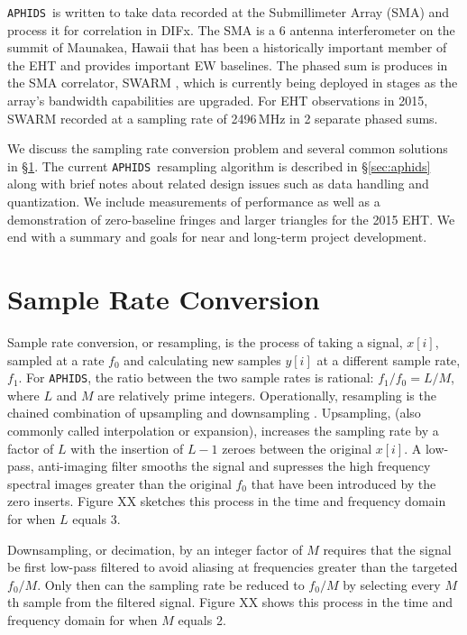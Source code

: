 \documentclass[11pt,preprint]{aastex}
\newcommand{\APHIDS}{\texttt{APHIDS}}
\begin{document}
\APHIDS\, is written to take data recorded at the Submillimeter Array (SMA) and process it for correlation in 
DIFx.  The SMA is a 6 antenna interferometer on the summit of Maunakea, Hawaii that has been a historically 
important member of the EHT and provides important EW baselines.  The phased sum is produces in the SMA 
correlator, SWARM \citep[\textbf{S}MA \textbf{W}ideband \textbf{A}stronomical \textbf{R}OACH2 \textbf{M}achine][]{weintroub14}, which is currently being deployed in stages as the array's bandwidth capabilities are 
upgraded.  For EHT observations in 2015, SWARM recorded at a sampling rate of 2496\,MHz in 2 separate phased
sums.

We discuss the sampling rate conversion problem and several common solutions in \S\ref{sec:src_basics}.
The current \APHIDS\, resampling algorithm is described in \S\ref{sec:aphids} along with brief notes about related 
design issues such as data handling and quantization.  We include measurements of performance as well as a 
demonstration of zero-baseline fringes and larger triangles for the 2015 EHT.  We end with a summary and 
goals for near and long-term project development.

\section{Sample Rate Conversion} \label{sec:src_basics}

Sample rate conversion, or resampling, is the process of taking a signal, $x[i]$, sampled at a rate $f_0$ and 
calculating new samples $y[i]$ at a different sample rate, $f_1$.  For \APHIDS, the ratio between the two 
sample rates is rational: $f_1/f_0 = L/M$, where $L$ and $M$ are relatively prime integers.  Operationally, 
resampling is the 
chained combination of upsampling and downsampling \citep{oppenheim10,lyons11}.  Upsampling, (also commonly 
called interpolation or expansion), 
increases the sampling rate 
by a factor of $L$ with the insertion of $L-1$ zeroes between the original $x[i]$.  A low-pass, 
anti-imaging filter smooths the signal and supresses the high frequency spectral images greater than the original 
$f_0$ that have been introduced by the zero inserts.  Figure XX sketches this process in the time and frequency 
domain for when $L$ equals 3. 

Downsampling, or decimation, by an integer factor of $M$ requires that the signal be first low-pass filtered to 
avoid aliasing 
at frequencies greater than the targeted $f_0/M$.  Only then can the sampling rate be reduced to $f_0/M$ by 
selecting every $M$th sample from the filtered signal.  Figure XX shows this process in the time and frequency 
domain for when $M$ equals 2.
\end{document}
